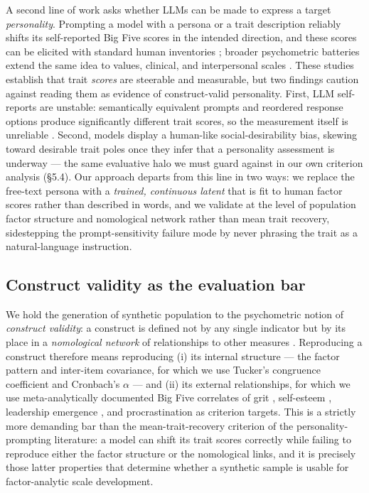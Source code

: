 \documentclass[11pt]{article}
\begin{document}
A second line of work asks whether LLMs can be made to express a target \textit{personality}. Prompting a model with a persona or a trait description reliably shifts its self-reported Big Five scores in the intended direction, and these scores can be elicited with standard human inventories \citep{serapiogarcia2023,jiang2023,miotto2022}; broader psychometric batteries extend the same idea to values, clinical, and interpersonal scales \citep{pellert2024,huang2024}. These studies establish that trait \textit{scores} are steerable and measurable, but two findings caution against reading them as evidence of construct-valid personality. First, LLM self-reports are unstable: semantically equivalent prompts and reordered response options produce significantly different trait scores, so the measurement itself is unreliable \citep{gupta2024}. Second, models display a human-like social-desirability bias, skewing toward desirable trait poles once they infer that a personality assessment is underway \citep{salecha2024} — the same evaluative halo we must guard against in our own criterion analysis (\S{}5.4). Our approach departs from this line in two ways: we replace the free-text persona with a \textit{trained, continuous latent} that is fit to human factor scores rather than described in words, and we validate at the level of population factor structure and nomological network rather than mean trait recovery, sidestepping the prompt-sensitivity failure mode by never phrasing the trait as a natural-language instruction.

\subsection{Construct validity as the evaluation bar}

We hold the generation of synthetic population to the psychometric notion of \textit{construct validity}: a construct is defined not by any single indicator but by its place in a \textit{nomological network} of relationships to other measures \citep{cronbachmeehl1955}. Reproducing a construct therefore means reproducing (i) its internal structure — the factor pattern and inter-item covariance, for which we use Tucker's congruence coefficient \citep{tucker1951,lorenzoseva2006} and Cronbach's $\alpha$ \citep{cronbach1951} — and (ii) its external relationships, for which we use meta-analytically documented Big Five correlates of grit \citep{duckworth2009}, self-esteem \citep{rosenberg1965,robins2001}, leadership emergence \citep{judge2002}, and procrastination \citep{steel2007} as criterion targets. This is a strictly more demanding bar than the mean-trait-recovery criterion of the personality-prompting literature: a model can shift its trait scores correctly while failing to reproduce either the factor structure or the nomological links, and it is precisely those latter properties that determine whether a synthetic sample is usable for factor-analytic scale development.
\end{document}
